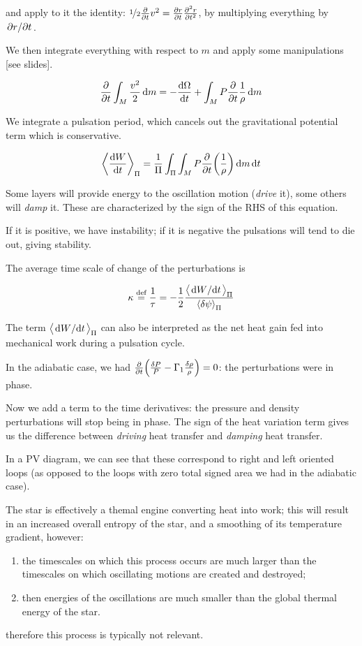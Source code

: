 \documentclass[main.tex]{subfiles}
\begin{document}
and apply to it the identity: \(\frac[i]{1}{2} \pdv{}{t} v^2 = \pdv{r}{t} \pdv[2]{r}{t}\), by multiplying everything by \(\pdv*{r}{t} \).

We then integrate everything with respect to \(m\) and apply some manipulations [see slides].

\begin{equation}
  \pdv{}{t} \int_M \frac{v^2}{2} \dd{m} =
  - \dv{\Omega}{t} + \int_M P \pdv{}{t} \frac{1}{\rho} \dd{m}
\end{equation}

We integrate a pulsation period, which cancels out the gravitational potential term which is conservative.

\begin{equation}
  \expval{\dv{W}{t}}_\Pi = \frac{1}{\Pi} \int_\Pi \int_M   P \pdv{}{t} \qty(\frac{1}{\rho}) \dd{m} \dd{t}
\end{equation}

Some layers will provide energy to the oscillation motion (\emph{drive} it), some others will \emph{damp} it.
These are characterized by the sign of the RHS of this equation.

If it is positive, we have instability; if it is negative the pulsations will tend to die out, giving stability.

The average time scale of change of the perturbations is

\begin{equation}
  \kappa \defeq \frac{1}{\tau} = -\frac{1}{2} \frac{\expval{\dv*{W}{t}}_\Pi}{\expval{ \delta \psi}_\Pi }
\end{equation}

The term \(\expval{\dv*{W}{t}}_\Pi \) can also be interpreted as the net heat gain fed into mechanical work during a pulsation cycle.

In the adiabatic case, we had \(\pdv{}{t}\qty( \frac{\delta P}{P} - \Gamma_1 \frac{\delta \rho}{\rho}) =0 \): the perturbations were in phase.

Now we add a term to the time derivatives: the pressure and density perturbations will stop being in phase. The sign of the heat variation term gives us the difference between \emph{driving} heat transfer and \emph{damping} heat transfer.

In a PV diagram, we can see that these correspond to right and left oriented loops (as opposed to the loops with zero total signed area we had in the adiabatic case).

\begin{bluebox}
    The star is effectively a themal engine converting heat into work; this will result in an increased overall entropy of the star, and a smoothing of its temperature gradient, however:
    \begin{enumerate}
        \item the timescales on which this process occurs are much larger than the timescales on which oscillating motions are created and destroyed;
        \item then energies of the oscillations are much smaller than the global thermal energy of the star.
    \end{enumerate}
    therefore this process is typically not relevant.
\end{bluebox}
\end{document}
